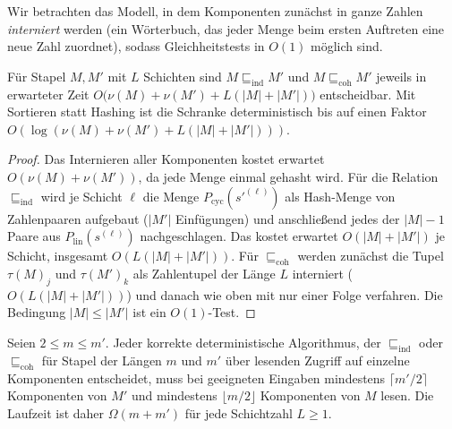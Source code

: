 Wir betrachten das Modell, in dem Komponenten zunächst in ganze Zahlen \emph{interniert} werden (ein Wörterbuch, das jeder Menge beim ersten Auftreten eine neue Zahl zuordnet), sodass Gleichheitstests in $O(1)$ möglich sind.

\begin{satz}
	\label{satz:univ_vergleich}
	Für Stapel $M,M'$ mit $L$ Schichten sind $M\sqsubseteq_{\mathrm{ind}}M'$ und $M\sqsubseteq_{\mathrm{coh}}M'$ jeweils in erwarteter Zeit $O\big(\nu(M)+\nu(M')+L(|M|+|M'|)\big)$ entscheidbar. Mit Sortieren statt Hashing ist die Schranke deterministisch bis auf einen Faktor $O(\log(\nu(M)+\nu(M')+L(|M|+|M'|)))$.
\end{satz}

\begin{proof}
	Das Internieren aller Komponenten kostet erwartet $O(\nu(M)+\nu(M'))$, da jede Menge einmal gehasht wird. Für die Relation $\sqsubseteq_{\mathrm{ind}}$ wird je Schicht $\ell$ die Menge $P_{\mathrm{cyc}}(s'^{(\ell)})$ als Hash-Menge von Zahlenpaaren aufgebaut ($|M'|$ Einfügungen) und anschließend jedes der $|M|-1$ Paare aus $P_{\mathrm{lin}}(s^{(\ell)})$ nachgeschlagen. Das kostet erwartet $O(|M|+|M'|)$ je Schicht, insgesamt $O(L(|M|+|M'|))$. Für $\sqsubseteq_{\mathrm{coh}}$ werden zunächst die Tupel $\tau(M)_j$ und $\tau(M')_k$ als Zahlentupel der Länge $L$ interniert ($O(L(|M|+|M'|))$) und danach wie oben mit nur einer Folge verfahren. Die Bedingung $|M|\le|M'|$ ist ein $O(1)$-Test.
\end{proof}

\begin{satz}
	\label{satz:univ_untere}
	Seien $2\le m\le m'$. Jeder korrekte deterministische Algorithmus, der $\sqsubseteq_{\mathrm{ind}}$ oder $\sqsubseteq_{\mathrm{coh}}$ für Stapel der Längen $m$ und $m'$ über lesenden Zugriff auf einzelne Komponenten entscheidet, muss bei geeigneten Eingaben mindestens $\lceil m'/2\rceil$ Komponenten von $M'$ und mindestens $\lfloor m/2\rfloor$ Komponenten von $M$ lesen. Die Laufzeit ist daher $\Omega(m+m')$ für jede Schichtzahl $L\ge1$.
\end{satz}

